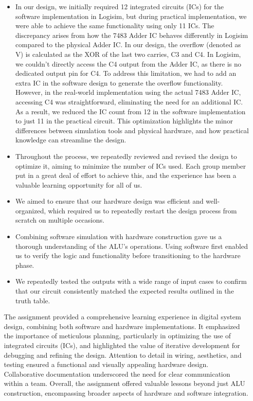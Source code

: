 \documentclass[11pt]{article}
\begin{document}
\begin{itemize}
    \item In our design, we initially required 12 integrated circuits (ICs) for the software implementation in Logisim, but during practical implementation, we were able to achieve the same functionality using only 11 ICs. The discrepancy arises from how the 7483 Adder IC behaves differently in Logisim compared to the physical Adder IC.
    In our design, the overflow (denoted as V) is calculated as the XOR of the last two carries, C3 and C4. In Logisim, we couldn't directly access the C4 output from the Adder IC, as there is no dedicated output pin for C4. To address this limitation, we had to add an extra IC in the software design to generate the overflow functionality.
    However, in the real-world implementation using the actual 7483 Adder IC, accessing C4 was straightforward, eliminating the need for an additional IC. As a result, we reduced the IC count from 12 in the software implementation to just 11 in the practical circuit.
    This optimization highlights the minor differences between simulation tools and physical hardware, and how practical knowledge can streamline the design.
    \item 
    Throughout the process, we repeatedly reviewed and revised the design to optimize it, aiming to minimize the number of ICs used. Each group member put in a great deal of effort to achieve this, and the experience has been a valuable learning opportunity for all of us.
    \item We aimed to ensure that our hardware design was efficient and well-organized, which required us to repeatedly restart the design process from scratch on multiple occasions.
    \item 
    Combining software simulation with hardware construction gave us a thorough understanding of the ALU's operations. Using software first enabled us to verify the logic and functionality before transitioning to the hardware phase.
    \item We repeatedly tested the outputs with a wide range of input cases to confirm that our circuit consistently matched the expected results outlined in the truth table.
\end{itemize}

The assignment provided a comprehensive learning experience in digital system design, combining both software and hardware implementations. It emphasized the importance of meticulous planning, particularly in optimizing the use of integrated circuits (ICs), and highlighted the value of iterative development for debugging and refining the design. Attention to detail in wiring, aesthetics, and testing ensured a functional and visually appealing hardware design. Collaborative documentation underscored the need for clear communication within a team. Overall, the assignment offered valuable lessons beyond just ALU construction, encompassing broader aspects of hardware and software integration.
\pagebreak
\end{document}
